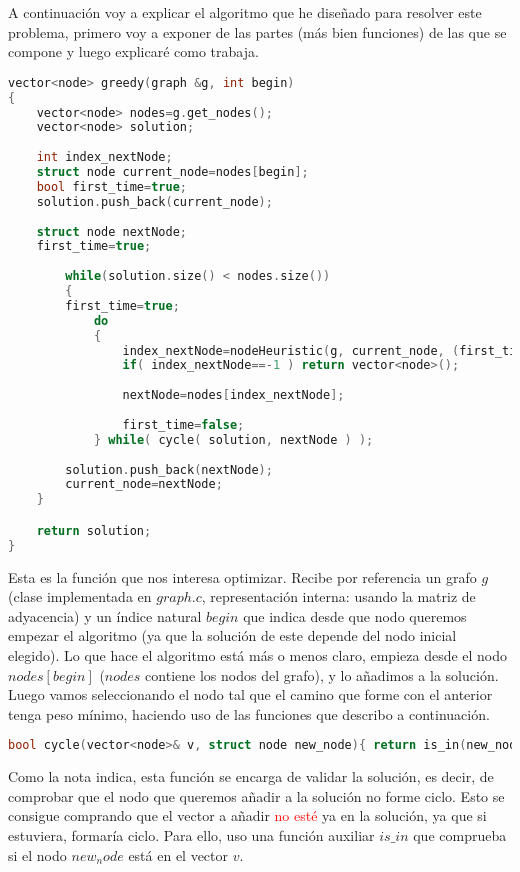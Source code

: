 \documentclass[11pt]{article}
\begin{document}
A continuación voy a explicar el algoritmo que he diseñado para resolver este problema, primero voy a exponer de las partes (más bien funciones) de las que se compone y luego explicaré como trabaja.


\begin{lstlisting}[language=C++, caption=Función obejtivo]
vector<node> greedy(graph &g, int begin)
{
	vector<node> nodes=g.get_nodes();
	vector<node> solution;
	
	int index_nextNode;
	struct node current_node=nodes[begin];
	bool first_time=true;
	solution.push_back(current_node);
	
	struct node nextNode;
	first_time=true;
	
		while(solution.size() < nodes.size())
		{
		first_time=true;
			do
			{
				index_nextNode=nodeHeuristic(g, current_node, (first_time)? 0:g.get_weight(current_node.label, nextNode.label), solution);
				if( index_nextNode==-1 ) return vector<node>();
				
				nextNode=nodes[index_nextNode];
				
				first_time=false;
			} while( cycle( solution, nextNode ) );
	
		solution.push_back(nextNode);
		current_node=nextNode;
	}

	return solution;
}
\end{lstlisting}

Esta es la función que nos interesa optimizar. Recibe por referencia un grafo $g$ (clase implementada en $graph.c$, representación interna: usando la matriz de adyacencia) y un índice natural $begin$ que indica desde que nodo queremos empezar el algoritmo (ya que la solución de este depende del nodo inicial elegido). Lo que hace el algoritmo está más o menos claro, empieza desde el nodo $nodes[begin]$ ($nodes$ contiene los nodos del grafo), y lo añadimos a la solución. Luego vamos seleccionando el nodo tal que el camino que forme con el anterior tenga peso mínimo, haciendo uso de las funciones que describo a continuación.

\begin{lstlisting}[language=C++, caption=Función para validar la solución]
bool cycle(vector<node>& v, struct node new_node){ return is_in(new_node.label, v); }
\end{lstlisting}

Como la nota indica, esta función se encarga de validar la solución, es decir, de comprobar que el nodo que queremos añadir a la solución no forme ciclo. Esto se consigue comprando que el vector a añadir \textcolor{red}{no esté} ya en la solución, ya que si estuviera, formaría ciclo. Para ello, uso una función auxiliar $is\_in$ que comprueba si el nodo $new_node$ está en el vector $v$.
\end{document}
